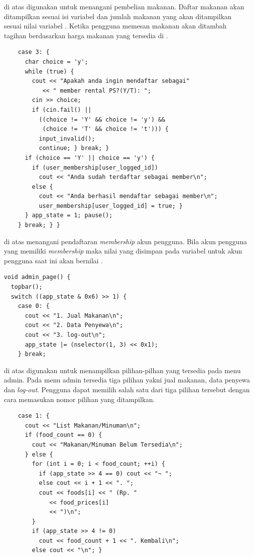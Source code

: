 \documentclass[../main.tex]{subfiles}
\begin{document}
{\Script} di atas digunakan untuk menangani pembelian makanan. Daftar makanan akan ditampilkan sesuai isi variabel  dan jumlah makanan yang akan ditampilkan sesuai nilai variabel . Ketika pengguna memesan makanan akan ditambah tagihan berdasarkan harga makanan yang tersedia di .

\begin{code}
\begin{verbatim}
    case 3: {
      char choice = 'y';
      while (true) {
        cout << "Apakah anda ingin mendaftar sebagai"
           << " member rental PS?(Y/T): ";
        cin >> choice;
        if (cin.fail() ||
          ((choice != 'Y' && choice != 'y') &&
           (choice != 'T' && choice != 't'))) {
          input_invalid();
          continue; } break; }
      if (choice == 'Y' || choice == 'y') {
        if (user_membership[user_logged_id])
          cout << "Anda sudah terdaftar sebagai member\n";
        else {
          cout << "Anda berhasil mendaftar sebagai member\n";
          user_membership[user_logged_id] = true; }
      } app_state = 1; pause();
    } break; } }
\end{verbatim}
\end{code}

{\Script} di atas menangani pendaftaran \textit{membership} akun pengguna. Bila akun pengguna yang memiliki \textit{membership} maka nilai yang disimpan pada variabel {\sarray}  untuk akun pengguna saat ini akan bernilai .

\begin{code}
\begin{verbatim}
void admin_page() {
  topbar();
  switch ((app_state & 0x6) >> 1) {
    case 0: {
      cout << "1. Jual Makanan\n";
      cout << "2. Data Penyewa\n";
      cout << "3. log-out\n";
      app_state |= (nselector(1, 3) << 0x1);
    } break;
\end{verbatim}
\end{code}

{\Script} di atas digunakan untuk menampilkan pilihan-pilhan yang tersedia pada menu admin. Pada menu admin tersedia tiga pilihan yakni jual makanan, data penyewa dan \textit{log-out}. Pengguna dapat memilih salah satu dari tiga pilihan tersebut dengan cara memasukan nomor pilihan yang ditampilkan.

\begin{code}
\begin{verbatim}
    case 1: {
      cout << "List Makanan/Minuman\n";
      if (food_count == 0) {
        cout << "Makanan/Minuman Belum Tersedia\n";
      } else {
        for (int i = 0; i < food_count; ++i) {
          if (app_state >> 4 == 0) cout << "~ ";
          else cout << i + 1 << ". ";
          cout << foods[i] << " (Rp. "
             << food_prices[i]
             << ")\n";
        }
        if (app_state >> 4 != 0)
          cout << food_count + 1 << ". Kembali\n";
        else cout << "\n"; }
\end{verbatim}
\end{code}
\end{document}
